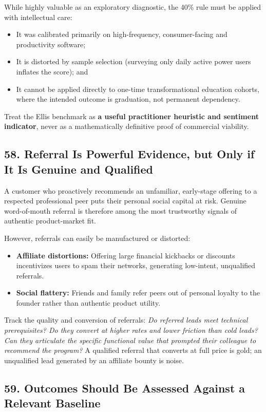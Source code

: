 While highly valuable as an exploratory diagnostic, the 40\% rule must be applied with intellectual care:
\begin{itemize}
    \item It was calibrated primarily on high-frequency, consumer-facing and productivity software;
    \item It is distorted by sample selection (surveying only daily active power users inflates the score); and
    \item It cannot be applied directly to one-time transformational education cohorts, where the intended outcome is graduation, not permanent dependency.
\end{itemize}

Treat the Ellis benchmark as \textbf{a useful practitioner heuristic and sentiment indicator}, never as a mathematically definitive proof of commercial viability.

\subsection*{58. Referral Is Powerful Evidence, but Only if It Is Genuine and Qualified}

A customer who proactively recommends an unfamiliar, early-stage offering to a respected professional peer puts their personal social capital at risk. Genuine word-of-mouth referral is therefore among the most trustworthy signals of authentic product-market fit.

However, referrals can easily be manufactured or distorted:
\begin{itemize}
    \item \textbf{Affiliate distortions:} Offering large financial kickbacks or discounts incentivizes users to spam their networks, generating low-intent, unqualified referrals.
    \item \textbf{Social flattery:} Friends and family refer peers out of personal loyalty to the founder rather than authentic product utility.
\end{itemize}

Track the quality and conversion of referrals: \emph{Do referred leads meet technical prerequisites? Do they convert at higher rates and lower friction than cold leads? Can they articulate the specific functional value that prompted their colleague to recommend the program?} A qualified referral that converts at full price is gold; an unqualified lead generated by an affiliate bounty is noise.

\subsection*{59. Outcomes Should Be Assessed Against a Relevant Baseline}

